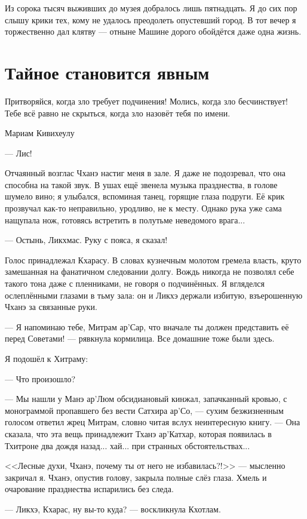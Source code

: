 Из сорока тысяч выживших до музея добралось лишь пятнадцать.
Я до сих пор слышу крики тех, кому не удалось преодолеть опустевший город.
В тот вечер я торжественно дал клятву --- отныне Машине дорого обойдётся даже одна жизнь.

\section{Тайное становится явным}

\epigraph
{Притворяйся, когда зло требует подчинения!
Молись, когда зло бесчинствует!
Тебе всё равно не скрыться, когда зло назовёт тебя по имени.}
{Мариам Кивихеулу}

--- Лис!

Отчаянный возглас Чханэ настиг меня в зале.
Я даже не подозревал, что она способна на такой звук.
В ушах ещё звенела музыка празднества, в голове шумело вино;
я улыбался, вспоминая танец, горящие глаза подруги.
Её крик прозвучал как-то неправильно, уродливо, не к месту.
Однако рука уже сама нащупала нож, готовясь встретить в полутьме неведомого врага...

--- Остынь, Ликхмас.
Руку с пояса, я сказал!

Голос принадлежал Кхарасу.
В словах кузнечным молотом гремела власть, круто замешанная на фанатичном следовании долгу.
Вождь никогда не позволял себе такого тона даже с пленниками, не говоря о подчинённых.
Я вгляделся ослеплёнными глазами в тьму зала: он и Ликхэ держали избитую, взъерошенную Чханэ за связанные руки.

--- Я напоминаю тебе, Митрам ар’Сар, что вначале ты должен представить её перед Советами! --- рявкнула кормилица.
Все домашние тоже были здесь.

Я подошёл к Хитраму:

--- Что произошло?

--- Мы нашли у Манэ ар’Люм обсидиановый кинжал, запачканный кровью, с монограммой пропавшего без вести Сатхира ар’Со, --- сухим безжизненным голосом ответил жрец Митрам, словно читая вслух неинтересную книгу.
--- Она сказала, что эта вещь принадлежит Тханэ ар’Катхар, которая появилась в Тхитроне два дождя назад... хай... при странных обстоятельствах...

<<Лесные духи, Чханэ, почему ты от него не избавилась?!>> --- мысленно закричал я.
Чханэ, опустив голову, закрыла полные слёз глаза.
Хмель и очарование празднества испарились без следа.

--- Ликхэ, Кхарас, ну вы-то куда? --- воскликнула Кхотлам.

